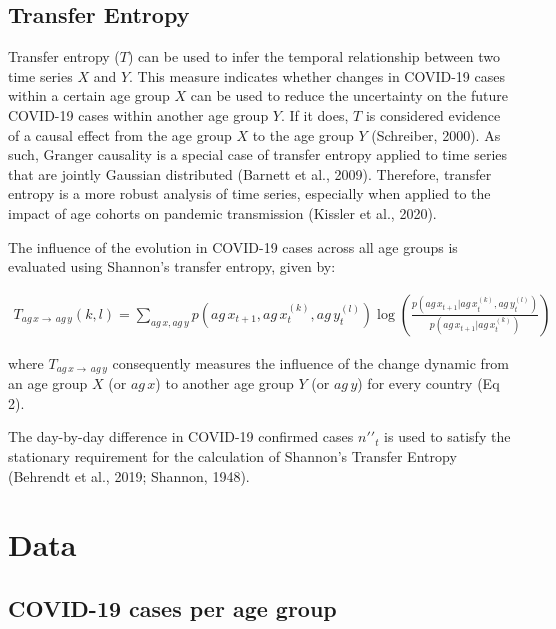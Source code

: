 \documentclass[unnumsec,webpdf,contemporary,large]{oup-authoring-template}%
\theoremstyle{thmstyleone}%
\theoremstyle{thmstyletwo}%
\theoremstyle{thmstylethree}%
\begin{document}
\hypertarget{transfer-entropy}{%
\subsection{Transfer Entropy}\label{transfer-entropy}}

Transfer entropy (\(T\)) can be used to infer the temporal relationship between two time series \(X\) and \(Y\). This measure indicates whether changes in COVID-19 cases within a certain age group \(X\) can be used to reduce the uncertainty on the future COVID-19 cases within another age group \(Y\). If it does, \(T\) is considered evidence of a causal effect from the age group \(X\) to the age group \(Y\) (Schreiber, 2000). As such, Granger causality is a special case of transfer entropy applied to time series that are jointly Gaussian distributed (Barnett et al., 2009). Therefore, transfer entropy is a more robust analysis of time series, especially when applied to the impact of age cohorts on pandemic transmission (Kissler et al., 2020).

The influence of the evolution in COVID-19 cases across all age groups is evaluated using Shannon's transfer entropy, given by:

\begin{align}
  \tag{2}
  T_{ag\,x \rightarrow\,ag\,y}(k,l) = \sum_{ag\,x,ag\,y} p\left(ag\,x_{t+1}, ag\,x_t^{(k)}, ag\,y_t^{(l)}\right) \log \left(\frac{p\left(ag\,x_{t+1}| ag\,x_t^{(k)}, ag\,y_t^{(l)}\right)}{p\left(ag\,x_{t+1}|ag\,x_t^{(k)}\right)}\right)
\end{align}

\noindent where \(T_{ag\,x \rightarrow\,ag\,y}\) consequently measures the influence of the change dynamic from an age group \(X\) (or \(ag\,x\)) to another age group \(Y\) (or \(ag\,y\)) for every country (Eq 2).

The day-by-day difference in COVID-19 confirmed cases \(n\prime\prime_t\) is used to satisfy the stationary requirement for the calculation of Shannon's Transfer Entropy (Behrendt et al., 2019; Shannon, 1948).

\hypertarget{data}{%
\section{Data}\label{data}}

\hypertarget{covid-19-cases-per-age-group}{%
\subsection{COVID-19 cases per age group}\label{covid-19-cases-per-age-group}}
\end{document}
